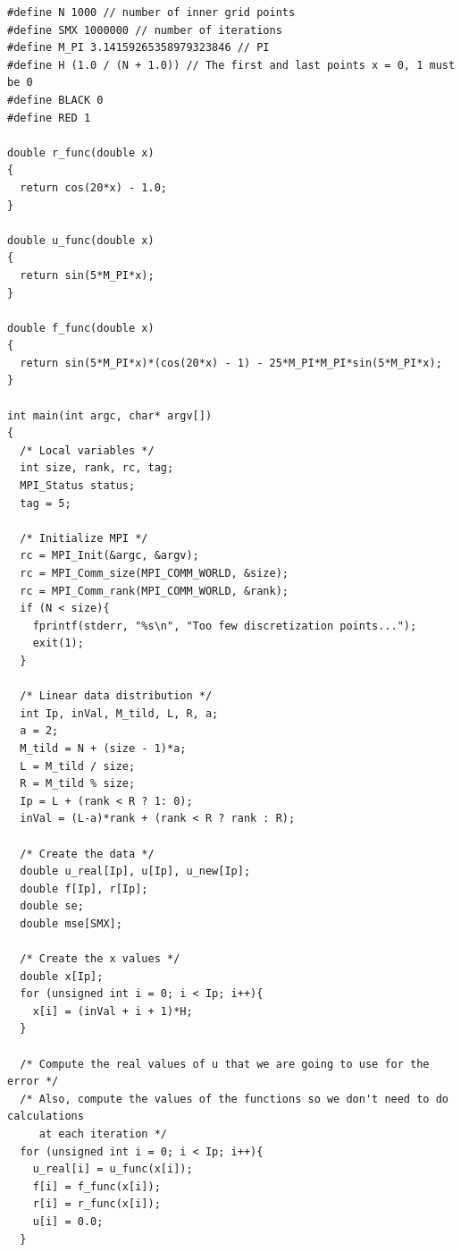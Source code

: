 \documentclass{article}
\begin{document}
\begin{enumerate}
\begin{lstlisting}[style=customc, caption={MPI implementation of an ODE solver using Jacobi iteration process}, label={lst:ode_jacobi}]
#define N 1000 // number of inner grid points
#define SMX 1000000 // number of iterations
#define M_PI 3.14159265358979323846 // PI
#define H (1.0 / (N + 1.0)) // The first and last points x = 0, 1 must be 0
#define BLACK 0
#define RED 1

double r_func(double x)
{
  return cos(20*x) - 1.0;
}

double u_func(double x)
{
  return sin(5*M_PI*x);
}

double f_func(double x)
{
  return sin(5*M_PI*x)*(cos(20*x) - 1) - 25*M_PI*M_PI*sin(5*M_PI*x);
}

int main(int argc, char* argv[])
{
  /* Local variables */
  int size, rank, rc, tag;
  MPI_Status status;
  tag = 5;

  /* Initialize MPI */
  rc = MPI_Init(&argc, &argv);
  rc = MPI_Comm_size(MPI_COMM_WORLD, &size);
  rc = MPI_Comm_rank(MPI_COMM_WORLD, &rank);
  if (N < size){
    fprintf(stderr, "%s\n", "Too few discretization points...");
    exit(1);
  }

  /* Linear data distribution */
  int Ip, inVal, M_tild, L, R, a;
  a = 2;
  M_tild = N + (size - 1)*a;
  L = M_tild / size;
  R = M_tild % size;
  Ip = L + (rank < R ? 1: 0);
  inVal = (L-a)*rank + (rank < R ? rank : R);

  /* Create the data */
  double u_real[Ip], u[Ip], u_new[Ip];
  double f[Ip], r[Ip];
  double se;
  double mse[SMX];

  /* Create the x values */
  double x[Ip];
  for (unsigned int i = 0; i < Ip; i++){
    x[i] = (inVal + i + 1)*H;
  }

  /* Compute the real values of u that we are going to use for the error */
  /* Also, compute the values of the functions so we don't need to do calculations
     at each iteration */
  for (unsigned int i = 0; i < Ip; i++){
    u_real[i] = u_func(x[i]);
    f[i] = f_func(x[i]);
    r[i] = r_func(x[i]);
    u[i] = 0.0;
  }


\end{lstlisting}
\end{enumerate}
\end{document}
